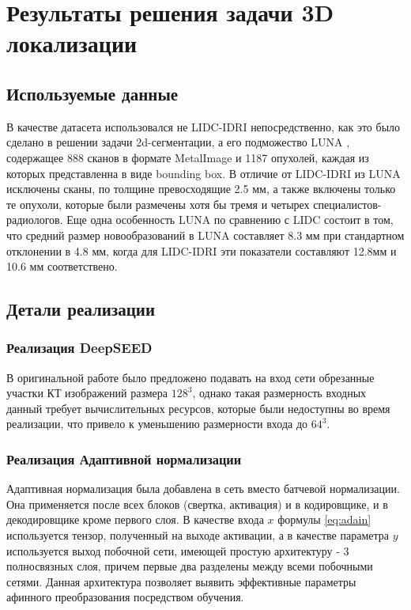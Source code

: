 \chapter{Результаты решения задачи 3D локализации}

\section{Используемые данные}

В качестве датасета использовался не LIDC-IDRI непосредственно, как это было сделано в решении задачи 2d-сегментации, а его подможество LUNA \cite{luna}, содержащее 888 сканов в формате MetalImage и 1187 опухолей, каждая из которых представленна в виде bounding box. В отличие от LIDC-IDRI из LUNA исключены сканы, по толщине превосходящие 2.5 мм, а также включены только те опухоли, которые были размечены хотя бы тремя и четырех специалистов-радиологов. Еще одна особенность LUNA по сравнению с LIDC состоит в том, что средний размер новообразований в LUNA составляет 8.3 мм при стандартном отклонении в 4.8 мм, когда для LIDC-IDRI эти показатели составляют 12.8мм и 10.6 мм соответствено.

\section{Детали реализации}

\subsection{Реализация DeepSEED}

В оригинальной работе было предложено подавать на вход сети обрезанные участки КТ изображений размера $128^3$, однако такая размерность входных данный требует вычислительных ресурсов, которые были недоступны во время реализации, что привело к уменьшению размерности входа до $64^3$.


\subsection{Реализация Адаптивной нормализации}

Адаптивная нормализация была добавлена в сеть вместо батчевой нормализации. Она применяется после всех блоков (свертка, активация) и в кодировщике, и в декодировщике кроме первого слоя. В качестве входа $x$ формулы \eqref{eq:adain} используется тензор, полученный на выходе активации, а в качестве параметра $y$ используется выход побочной сети, имеющей простую архитектуру - 3 полносвязных слоя, причем первые два разделены между всеми побочными сетями. Данная архитектура позволяет выявить эффективные параметры афинного преобразования посредством обучения.

